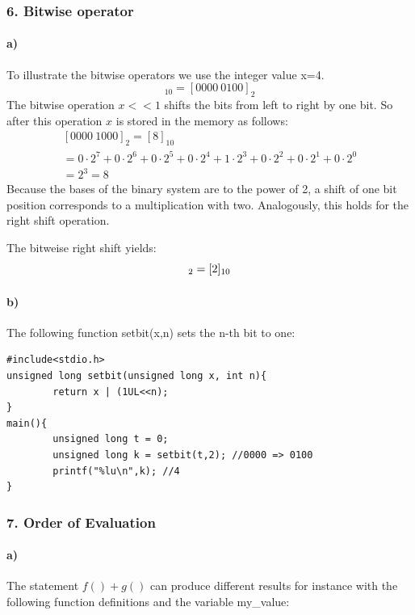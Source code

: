 \documentclass[12pt]{article}
\begin{document}
\subsubsection*{6. Bitwise operator}
\paragraph{a)}
To illustrate the bitwise operators we use the integer value x=4.
\begin{equation}
[4]_{10} = [0000 \: 0100 ]_{2}
\end{equation}
The bitwise operation $x<<1$ shifts the bits from left to right by one bit. So after this operation $x$ is stored in the memory as follows:
\begin{equation}
\begin{split}
[0000 \: 1000 ]_{2} = [8]_{10} \\ 
= 0 \cdot 2^7 + 0 \cdot 2^6 + 0 \cdot 2^5 + 0 \cdot 2^4 + 1 \cdot 2^3 + 0 \cdot 2^2 + 0 \cdot 2^1 + 0 \cdot 2^0 \\
= 2^3 = 8
\end{split}
\end{equation}
Because the bases of the binary system are to the power of 2, a shift of one bit position corresponds to a multiplication with two. Analogously, this  holds for the right shift operation.


The bitweise right shift yields:
\begin{equation}
[0000 \: 0010 ]_{2} = [2]_{10} \\ 
\end{equation}
\paragraph{b)}
The following function setbit(x,n) sets the n-th bit to one:
\begin{lstlisting}
#include<stdio.h>
unsigned long setbit(unsigned long x, int n){
        return x | (1UL<<n);
}
main(){
        unsigned long t = 0;
        unsigned long k = setbit(t,2); //0000 => 0100
        printf("%lu\n",k); //4
}
\end{lstlisting}

\subsubsection*{7. Order of Evaluation}
\paragraph{a)}
The statement $f() + g()$ can produce different results for instance with the following function definitions and the variable my\_value:
\end{document}
